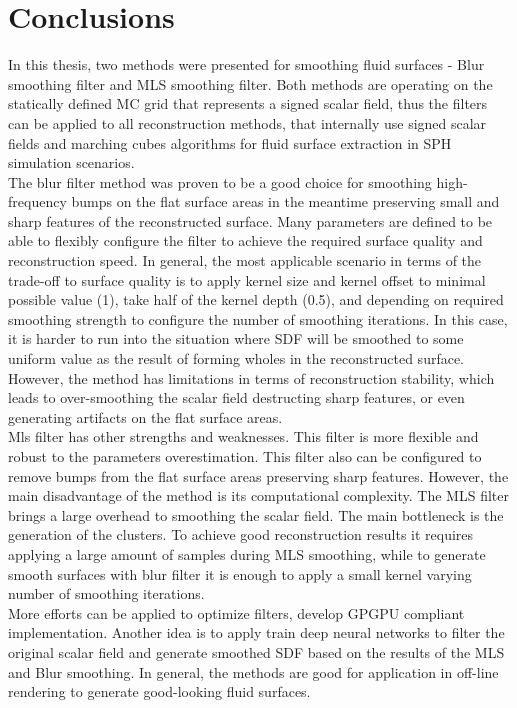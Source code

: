 \chapter{Conclusions}
In this thesis, two methods were presented for smoothing fluid surfaces - Blur smoothing filter and MLS smoothing filter. Both methods are operating on the statically defined MC grid that represents a signed scalar field, thus the filters can be applied to all reconstruction methods, that internally use signed scalar fields and marching cubes algorithms for fluid surface extraction in SPH simulation scenarios.\\
The blur filter method was proven to be a good choice for smoothing high-frequency bumps on the flat surface areas in the meantime preserving small and sharp features of the reconstructed surface. Many parameters are defined to be able to flexibly configure the filter to achieve the required surface quality and reconstruction speed. In general, the most applicable scenario in terms of the trade-off to surface quality is to apply kernel size and kernel offset to minimal possible value (1), take half of the kernel depth (0.5), and depending on required smoothing strength to configure the number of smoothing iterations. In this case, it is harder to run into the situation where SDF will be smoothed to some uniform value as the result of forming wholes in the reconstructed surface.
However, the method has limitations in terms of reconstruction stability, which leads to over-smoothing the scalar field destructing sharp features, or even generating artifacts on the flat surface areas.\\
Mls filter has other strengths and weaknesses. This filter is more flexible and robust to the parameters overestimation. This filter also can be configured to remove bumps from the flat surface areas preserving sharp features. However, the main disadvantage of the method is its computational complexity. The MLS filter brings a large overhead to smoothing the scalar field. The main bottleneck is the generation of the clusters. To achieve good reconstruction results it requires applying a large amount of samples during MLS smoothing, while to generate smooth surfaces with blur filter it is enough to apply a small kernel varying number of smoothing iterations.\\
More efforts can be applied to optimize filters, develop GPGPU compliant implementation. Another idea is to apply train deep neural networks to filter the original scalar field and generate smoothed SDF based on the results of the MLS and Blur smoothing. In general, the methods are good for application in off-line rendering to generate good-looking fluid surfaces.